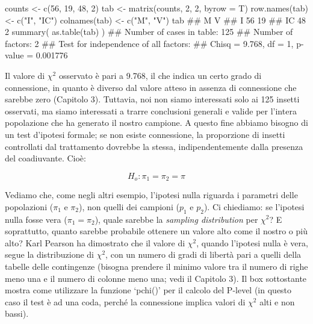 \documentclass[a4paper,12pt,oneside]{book}
\newenvironment{Shaded}{\begin{snugshade}}{\end{snugshade}}
\newcommand{\DecValTok}[1]{#1}
\newcommand{\StringTok}[1]{#1}
\newcommand{\DocumentationTok}[1]{#1}
\newcommand{\OtherTok}[1]{#1}
\newcommand{\FunctionTok}[1]{#1}
\newcommand{\AttributeTok}[1]{#1}
\newcommand{\NormalTok}[1]{#1}
\begin{document}
\begin{Shaded}
\begin{Highlighting}[]
\NormalTok{counts }\OtherTok{\textless{}{-}} \FunctionTok{c}\NormalTok{(}\DecValTok{56}\NormalTok{, }\DecValTok{19}\NormalTok{, }\DecValTok{48}\NormalTok{, }\DecValTok{2}\NormalTok{)}
\NormalTok{tab }\OtherTok{\textless{}{-}} \FunctionTok{matrix}\NormalTok{(counts, }\DecValTok{2}\NormalTok{, }\DecValTok{2}\NormalTok{, }\AttributeTok{byrow =}\NormalTok{ T)}
\FunctionTok{row.names}\NormalTok{(tab) }\OtherTok{\textless{}{-}} \FunctionTok{c}\NormalTok{(}\StringTok{"I"}\NormalTok{, }\StringTok{"IC"}\NormalTok{)}
\FunctionTok{colnames}\NormalTok{(tab) }\OtherTok{\textless{}{-}} \FunctionTok{c}\NormalTok{(}\StringTok{"M"}\NormalTok{, }\StringTok{"V"}\NormalTok{)}
\NormalTok{tab}
\DocumentationTok{\#\#     M  V}
\DocumentationTok{\#\# I  56 19}
\DocumentationTok{\#\# IC 48  2}
\FunctionTok{summary}\NormalTok{( }\FunctionTok{as.table}\NormalTok{(tab) )}
\DocumentationTok{\#\# Number of cases in table: 125 }
\DocumentationTok{\#\# Number of factors: 2 }
\DocumentationTok{\#\# Test for independence of all factors:}
\DocumentationTok{\#\#  Chisq = 9.768, df = 1, p{-}value = 0.001776}
\end{Highlighting}
\end{Shaded}

Il valore di \(\chi^2\) osservato è pari a 9.768, il che indica un certo grado di connessione, in quanto è diverso dal valore atteso in assenza di connessione che sarebbe zero (Capitolo 3). Tuttavia, noi non siamo interessati solo ai 125 insetti osservati, ma siamo interessati a trarre conclusioni generali e valide per l'intera popolazione che ha generato il nostro campione. A questo fine abbiamo bisogno di un test d'ipotesi formale; se non esiste connessione, la proporzione di insetti controllati dal trattamento dovrebbe la stessa, indipendentemente dalla presenza del coadiuvante. Cioè:

\[H_o :\pi_1  = \pi_2  = \pi\]

Vediamo che, come negli altri esempio, l'ipotesi nulla riguarda i parametri delle popolazioni (\(\pi_1\) e \(\pi_2\)), non quelli dei campioni (\(p_1\) e \(p_2\)). Ci chiediamo: se l'ipotesi nulla fosse vera (\(\pi_1 = \pi_2\)), quale sarebbe la \emph{sampling distribution} per \(\chi^2\)? E soprattutto, quanto sarebbe probabile ottenere un valore alto come il nostro o più alto? Karl Pearson ha dimostrato che il valore di \(\chi^2\), quando l'ipotesi nulla è vera, segue la distribuzione di \(\chi^2\), con un numero di gradi di libertà pari a quelli della tabelle delle contingenze (bisogna prendere il minimo valore tra il numero di righe meno una e il numero di colonne meno una; vedi il Capitolo 3). Il box sottostante mostra come utilizzare la funzione `pchi()' per il calcolo del P-level (in questo caso il test è ad una coda, perché la connessione implica valori di \(\chi^2\) alti e non bassi).
\end{document}
